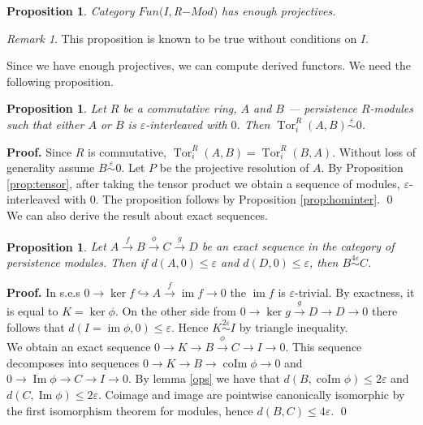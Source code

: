 \documentclass[english,12pt]{article}
\newcounter{stmcounter}[section]
\numberwithin{equation}{section}
\newtheorem{proposition}[stmcounter]{Proposition}
\theoremstyle{definition}
\theoremstyle{remark}
\newtheorem{remark}[stmcounter]{Remark}
\newenvironment{pf}{\noindent\textbf{Proof.}}{\qed}
\renewcommand{\leq}{\leqslant}
\begin{document}
\begin{proposition}
  Category $Fun(I, $R$-Mod)$ has enough projectives.
\end{proposition}

\begin{remark}
 This proposition is known to be true without conditions on $I$. {\cite[Page 2]{Mitchell81}}
\end{remark}

Since we have enough projectives, we can compute derived functors. We need the following proposition.\\

\begin{proposition}
  \label{prop:tor}
  Let $R$ be a commutative ring, $A$ and $B$ --- persistence $R$-modules such that either $A$ or $B$ is $\varepsilon$-interleaved with $0$. Then $\operatorname{Tor}_i^R(A,B) \stackrel{\varepsilon}{\sim} 0$.
\end{proposition}

\begin{pf}
  Since $R$ is commutative, $\operatorname{Tor}_i^R(A,B) = \operatorname{Tor}_i^R(B,A)$. Without loss of generality assume $B \stackrel{\varepsilon}{\sim} 0$. Let $P$ be the projective resolution of $A$. By Proposition \ref{prop:tensor}, after taking the tensor product we obtain a sequence of modules, $\varepsilon$-interleaved with $0$. The proposition follows by Proposition \ref{prop:hominter}.
\end{pf}\\

We can also derive the result about exact sequences.\\

\begin{proposition}
  \label{major}
  Let $A \xrightarrow{f} B \xrightarrow{\phi} C \xrightarrow{g} D$ be an exact sequence in the category of persistence modules. Then if $d(A,0) \leq \varepsilon$ and $d(D,0) \leq \varepsilon$, then $B \stackrel{4\varepsilon}{\sim} C$.
\end{proposition}

\begin{pf}
  In s.e.s $0 \to \ker{f} \hookrightarrow A \xrightarrow{f} \operatorname{im}f \to 0$ the $\operatorname{im}f$ is $\varepsilon$-trivial. By exactness, it is equal to $K = \ker \phi$. On the other side from $0 \to \ker{g} \xrightarrow{g} D \to D \to 0$ there follows that $d(I = \operatorname{im} \phi, 0) \leq \varepsilon$. Hence $K \stackrel{2\varepsilon}{\sim} I$ by triangle inequality.\\

  We obtain an exact sequence $0 \to K \to B \xrightarrow{\phi} C \to I \to 0$. This sequence decomposes into sequences $0 \to K \to B \to \operatorname{coIm}\phi \to 0$ and $0 \to \operatorname{Im}\phi \to C \to I \to 0$. By lemma \ref{ops} we have that $d(B,\operatorname{coIm}\phi) \leq 2\varepsilon$ and $d(C,\operatorname{Im}\phi) \leq 2\varepsilon$. Coimage and image are pointwise canonically isomorphic by the first isomorphism theorem for modules, hence $d(B, C) \leq 4\varepsilon$.
\end{pf}\\
\end{document}

